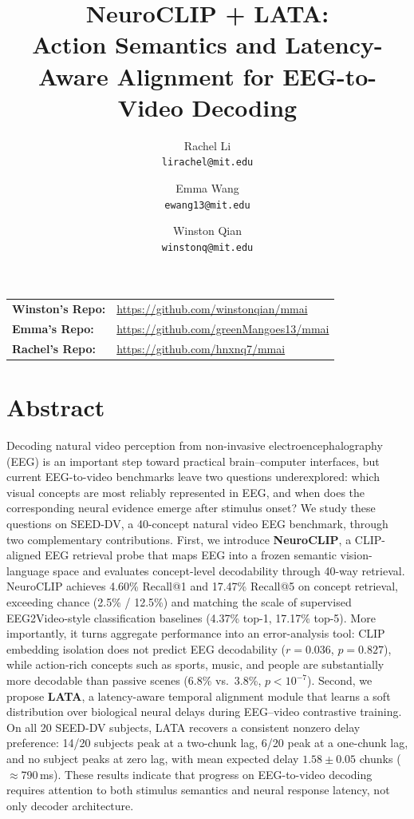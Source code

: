 \documentclass{article}
\title{NeuroCLIP + LATA:\\
Action Semantics and Latency-Aware Alignment for EEG-to-Video Decoding}
\author{
Rachel Li \\
\texttt{lirachel@mit.edu}
\and
Emma Wang \\
\texttt{ewang13@mit.edu}
\and
Winston Qian \\
\texttt{winstonq@mit.edu}
}
\begin{document}
\maketitle

\vspace{-0.5em}
\begin{center}
\small
\begin{tabular}{ll}
\textbf{Winston's Repo:} & \url{https://github.com/winstonqian/mmai} \\
\textbf{Emma's Repo:} & \url{https://github.com/greenMangoes13/mmai} \\
\textbf{Rachel's Repo:} & \url{https://github.com/hnxnq7/mmai} \\
\end{tabular}
\end{center}
\vspace{-0.8em}

\section*{Abstract}

Decoding natural video perception from non-invasive electroencephalography (EEG)
is an important step toward practical brain--computer interfaces, but current
EEG-to-video benchmarks leave two questions underexplored: which visual concepts
are most reliably represented in EEG, and when does the corresponding neural
evidence emerge after stimulus onset? We study these questions on SEED-DV, a
40-concept natural video EEG benchmark, through two complementary contributions.
First, we introduce \textbf{NeuroCLIP}, a
CLIP-aligned EEG retrieval probe that maps EEG into a frozen semantic vision-language
space and evaluates concept-level decodability through 40-way retrieval. NeuroCLIP
achieves 4.60\% Recall@1 and 17.47\% Recall@5 on concept retrieval, exceeding
chance (2.5\% / 12.5\%) and matching the scale of supervised EEG2Video-style
classification baselines (4.37\% top-1, 17.17\% top-5). More importantly, it
turns aggregate performance into an error-analysis tool: CLIP embedding isolation
does not predict EEG decodability ($r{=}0.036$, $p{=}0.827$), while action-rich
concepts such as sports, music, and people are substantially more decodable than
passive scenes (6.8\% vs.\ 3.8\%, $p{<}10^{-7}$). Second, we propose
\textbf{LATA}, a latency-aware temporal alignment module that learns a soft
distribution over biological neural delays during EEG--video contrastive training.
On all 20 SEED-DV subjects, LATA recovers a consistent nonzero delay preference:
14/20 subjects peak at a two-chunk lag, 6/20 peak at a one-chunk lag, and no
subject peaks at zero lag, with mean expected delay $1.58 \pm 0.05$ chunks
($\approx$790\,ms). These results indicate that progress on EEG-to-video decoding
requires attention to both stimulus semantics and neural response latency, not
only decoder architecture.
\end{document}
